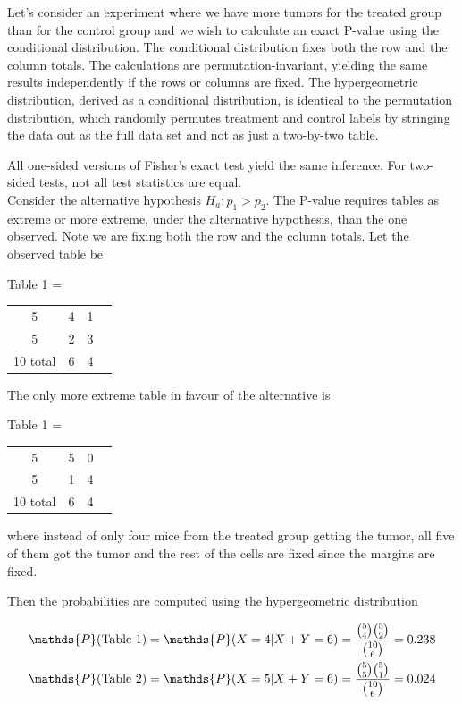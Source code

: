 \documentclass{homework}
\begin{document}
Let's consider an experiment where we have more tumors for the treated group than for the control group and we wish to calculate an exact P-value using the conditional distribution. The conditional distribution fixes both the row and the column totals. The calculations are permutation-invariant, yielding the same results independently if the rows or columns are fixed. The hypergeometric distribution, derived as a conditional distribution, is identical to the permutation distribution, which randomly permutes treatment and control labels by stringing the data out as the full data set and not as just a two-by-two table. 

All one-sided versions of Fisher's exact test yield the same inference. For two-sided tests, not all test statistics are equal. \\

Consider the alternative hypothesis $H_a: p_1 > p_2$. The P-value requires tables as extreme or more extreme, under the alternative hypothesis, than the one observed. Note we are fixing both the row and the column totals. Let the observed table be

\begin{center}
Table 1 = 
\begin{tabular}{ |c|c|c|c| } 
5 & 4 & 1 \\ 
5 & 2 & 3 \\  
10 total & 6 & 4
\end{tabular}
\end{center}

The only more extreme table in favour of the alternative is

\begin{center}
Table 1 = 
\begin{tabular}{ |c|c|c|c| } 
5 & 5 & 0 \\ 
5 & 1 & 4 \\  
10 total & 6 & 4
\end{tabular}
\end{center}

where instead of only four mice from the treated group getting the tumor, all five of them got the tumor and the rest of the cells are fixed since the margins are fixed. 

Then the probabilities are computed using the hypergeometric distribution

\begin{align*}
    \mathds{P}(\textnormal{Table 1}) &= \mathds{P}(X=4 | X+Y=6) = \frac{{{5}\choose{4}}{{5}\choose{2}}}{{{10}\choose{6}}} = 0.238 \\
    \mathds{P}(\textnormal{Table 2}) &= \mathds{P}(X=5 | X+Y=6) = \frac{{{5}\choose{5}}{{5}\choose{1}}}{{{10}\choose{6}}} = 0.024 
\end{align*}
\end{document}
